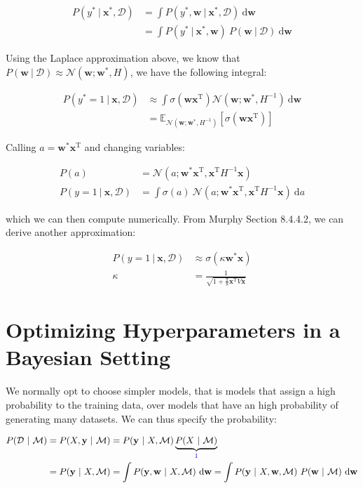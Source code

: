 \documentclass{article}
\newcommand{\vf}[1]{\mathbf{#1}}
\newcommand{\normal}{\mathcal{N}}
\newcommand{\bx}{\vf{x}}
\newcommand{\by}{\vf{y}}
\newcommand{\bw}{\vf{w}}
\newcommand{\giv}{\ |\ }
\newcommand{\data}{\mathcal{D}}
\newcommand{\model}{\mathcal{M}}
\newcommand{\de}{\text{d}}
\newcommand{\tran}{\text{T}}
\newcommand{\blue}[1]{\textcolor{blue}{#1}}
\begin{document}
\begin{align*}
    P(y^* \giv \bx^*, \data) &= \int P(y^*, \bw \giv \bx^*, \data)\ \de\bw \\
    &= \int P(y^* \giv \bx^*, \bw)\ P(\bw \giv \data)\ \de\bw
\end{align*}

Using the Laplace approximation above, we know that $P(\bw \giv \data) \approx \normal(\bw; \bw^*, H)$, we have the following integral:

\begin{align*}
    P(y^* = 1 \giv \bx, \data) &\approx
        \int \sigma(\bw \bx^\text{T}) \normal(\bw; \bw^*, H^{-1})\ \de\bw \\
    &= \mathbb{E}_{\normal(\bw; \bw^*, H^{-1})} [\sigma(\bw \bx^\text{T})]
\end{align*}

Calling $a = \bw^* \bx^\text{T}$ and changing variables:

\begin{align*}
    P(a) &= \normal(a; \bw^* \bx^\tran, \bx^\tran H^{-1} \bx)\\
    P(y = 1 \giv \bx, \data) &= 
        \int \sigma(a)\ \normal(a; \bw^* \bx^\tran, \bx^\tran H^{-1} \bx) \ \de a
\end{align*}

which we can then compute numerically. From Murphy Section 8.4.4.2, we can derive another approximation:

\begin{align*}
    P(y = 1 \giv \bx, \data) &\approx \sigma(\kappa \bw^* \bx) \\
    \kappa &= \frac{
        1
    }{
        \sqrt{
            1 + \frac{\pi}{8} \bx^\tran V \bx
        }
    }
\end{align*}

\section{Optimizing Hyperparameters in a Bayesian Setting}
We normally opt to choose simpler models, that is models that assign a high probability to the training data, over models that have an high probability of generating many datasets. We can thus specify the probability:

\begin{align*}
    P(\data \giv \model) &= P(X, \by \giv \model) =
        P(\by \giv X, \model) \underbrace{P(X \giv \model)}_\text{\blue{1}} \\
    &= P(\by \giv X, \model) = \int P(\by, \bw \giv X, \model)\ \de\bw =
        \int P(\by \giv X, \bw, \model)\ P(\bw \giv \model)\ \de\bw
\end{align*}
\end{document}

